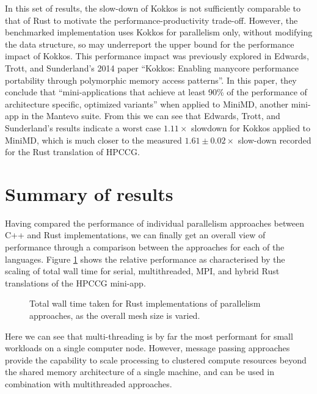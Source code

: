 In this set of results, the slow-down of Kokkos is not sufficiently comparable to that of Rust to motivate the performance-productivity trade-off. However, the benchmarked implementation uses Kokkos for parallelism only, without modifying the data structure, so may underreport the upper bound for the performance impact of Kokkos. This performance impact was previously explored in Edwards, Trott, and Sunderland's 2014 paper ``Kokkos: Enabling manycore performance portability through polymorphic memory access patterns''. In this paper, they conclude that ``mini-applications that achieve at least 90\% of the performance of architecture specific, optimized variants'' \cite{carteredwardsKokkosEnablingManycore2014} when applied to MiniMD, another \acrshort{mini-app} in the Mantevo suite. From this we can see that Edwards, Trott, and Sunderland's results indicate a worst case $1.11 \times$ slowdown for Kokkos applied to MiniMD, which is much closer to the measured $1.61 \pm 0.02 \times$ slow-down recorded for the Rust translation of \acrshort{HPCCG}.


\section{Summary of results}
\label{sec:performance-results}

Having compared the performance of individual parallelism approaches between C++ and Rust implementations, we can finally get an overall view of performance through a comparison between the approaches for each of the languages. Figure \ref{fig:translation_parallelism_rust} shows the relative performance as characterised by the scaling of total wall time for serial, multithreaded, MPI, and hybrid Rust translations of the \acrshort{HPCCG} \acrshort{mini-app}.

\begin{figure}[H]
    \centering
    \fbox{}
    \captionsetup{skip=0pt}
    \caption{Total wall time taken for Rust implementations of parallelism approaches, as the overall mesh size is varied.}
    \label{fig:translation_parallelism_rust}
\end{figure}

Here we can see that multi-threading is by far the most performant for small workloads on a single computer node. However, message passing approaches provide the capability to scale processing to clustered compute resources beyond the shared memory architecture of a single machine, and can be used in combination with multithreaded approaches.

